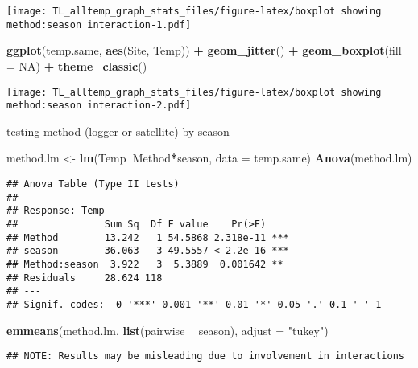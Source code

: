 \documentclass[
]{article}
\newenvironment{Shaded}{\begin{snugshade}}{\end{snugshade}}
\newcommand{\DataTypeTok}[1]{\textcolor[rgb]{0.13,0.29,0.53}{#1}}
\newcommand{\KeywordTok}[1]{\textcolor[rgb]{0.13,0.29,0.53}{\textbf{#1}}}
\newcommand{\NormalTok}[1]{#1}
\newcommand{\OperatorTok}[1]{\textcolor[rgb]{0.81,0.36,0.00}{\textbf{#1}}}
\newcommand{\OtherTok}[1]{\textcolor[rgb]{0.56,0.35,0.01}{#1}}
\newcommand{\StringTok}[1]{\textcolor[rgb]{0.31,0.60,0.02}{#1}}
\begin{document}
\texttt{[image: TL\_alltemp\_graph\_stats\_files/figure-latex/boxplot showing method:season interaction-1.pdf]}

\begin{Shaded}
\begin{Highlighting}[]
\KeywordTok{ggplot}\NormalTok{(temp.same, }\KeywordTok{aes}\NormalTok{(Site, Temp)) }\OperatorTok{+}\StringTok{ }
\StringTok{   }\KeywordTok{geom_jitter}\NormalTok{() }\OperatorTok{+}
\StringTok{   }\KeywordTok{geom_boxplot}\NormalTok{(}\DataTypeTok{fill =} \OtherTok{NA}\NormalTok{) }\OperatorTok{+}\StringTok{ }
\StringTok{   }\KeywordTok{theme_classic}\NormalTok{()}
\end{Highlighting}
\end{Shaded}

\texttt{[image: TL\_alltemp\_graph\_stats\_files/figure-latex/boxplot showing method:season interaction-2.pdf]}

testing method (logger or satellite) by season

\begin{Shaded}
\begin{Highlighting}[]
\NormalTok{method.lm <-}\StringTok{ }\KeywordTok{lm}\NormalTok{(Temp}\OperatorTok{~}\NormalTok{Method}\OperatorTok{*}\NormalTok{season, }\DataTypeTok{data =}\NormalTok{ temp.same)}
\KeywordTok{Anova}\NormalTok{(method.lm)}
\end{Highlighting}
\end{Shaded}

\begin{verbatim}
## Anova Table (Type II tests)
## 
## Response: Temp
##               Sum Sq  Df F value    Pr(>F)    
## Method        13.242   1 54.5868 2.318e-11 ***
## season        36.063   3 49.5557 < 2.2e-16 ***
## Method:season  3.922   3  5.3889  0.001642 ** 
## Residuals     28.624 118                      
## ---
## Signif. codes:  0 '***' 0.001 '**' 0.01 '*' 0.05 '.' 0.1 ' ' 1
\end{verbatim}

\begin{Shaded}
\begin{Highlighting}[]
\KeywordTok{emmeans}\NormalTok{(method.lm, }\KeywordTok{list}\NormalTok{(pairwise }\OperatorTok{~}\StringTok{ }\NormalTok{season), }\DataTypeTok{adjust =} \StringTok{"tukey"}\NormalTok{)}
\end{Highlighting}
\end{Shaded}

\begin{verbatim}
## NOTE: Results may be misleading due to involvement in interactions
\end{verbatim}
\end{document}
